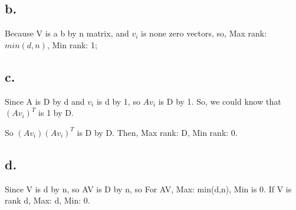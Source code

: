\documentclass{article}
\begin{document}
\subsection*{b.}
Because V is a b by n matrix, and $v_i$ is none zero vectors, so, \newline
Max rank: $min(d,n)$, Min rank: 1;
\subsection*{c.}
Since A is D by d and $v_i$ is d by 1, so $Av_i$ is D by 1. So, we could know that $(Av_i)^T$ is 1 by D. \newline

So $(Av_i)(Av_i)^T$ is D by D. Then, \newline
Max rank: D, Min rank: 0.
\subsection*{d.}
Since V is d by n, so AV is D by n, so\newline
For AV, Max: min(d,n), Min is 0.\newline
If V is rank d, Max: d, Min: 0.
\end{document}
